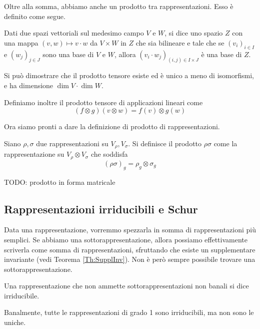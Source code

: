 \documentclass[a4paper,10pt,oneside]{math_article}
\begin{document}
    Oltre alla somma, abbiamo anche un prodotto tra rappresentazioni. Esso è definito come segue. 
    
    \begin{mydef}
     Dati due spazi vettoriali sul medesimo campo $V$ e $W$, si dice  uno spazio $Z$ con una mappa $(v,w) \mapsto v\cdot w$ da $V\times W$ in $Z$ che sia bilineare e tale che se $(v_i)_{i\in I}$ e $(w_j)_{j\in J}$ sono una base di $V$ e $W$, allora $(v_i\cdot w_j)_{(i,j)\in I\times J}$ è una base di $Z$.
    \end{mydef}
    
    Si può dimostrare che il prodotto tensore esiste ed è unico a meno di isomorfismi, e ha dimensione $\dim V \cdot \dim W$.
     
    Definiamo inoltre il prodotto tensore di applicazioni lineari come 
    \[
     (f \otimes g)(v\otimes w)=f(v)\otimes g(w) 
    \]
    
    Ora siamo pronti a dare la definizione di prodotto di rappresentazioni.

    \begin{mydef}
      Siano $\rho,\sigma$ due rappresentazioni su $V_\rho,V_\sigma$. Si definisce il prodotto $\rho\sigma$ come la rappresentazione su $V_\rho \otimes V_\sigma$ che soddisfa
      \[
       (\rho\sigma)_g = \rho_g \otimes \sigma_g
      \]

     
    \end{mydef}

    TODO: prodotto in forma matricale
  
  \subsection{Rappresentazioni irriducibili e Schur}
    Data una rappresentazione, vorremmo spezzarla in somma di rappresentazioni più semplici. Se abbiamo una sottorappresentazione, allora possiamo effettivamente scriverla come somma di rappresentazioni, sfruttando che esiste un supplementare invariante (vedi Teorema \ref{Th:SupplInv}). Non è però sempre possibile trovare una sottorappresentazione.
    \begin{mydef}
      Una rappresentazione che non ammette sottorappresentazioni non banali si dice irriducibile.
    \end{mydef}
    
    Banalmente, tutte le rappresentazioni di grado 1 sono irriducibili, ma non sono le uniche.
    
\end{document}
